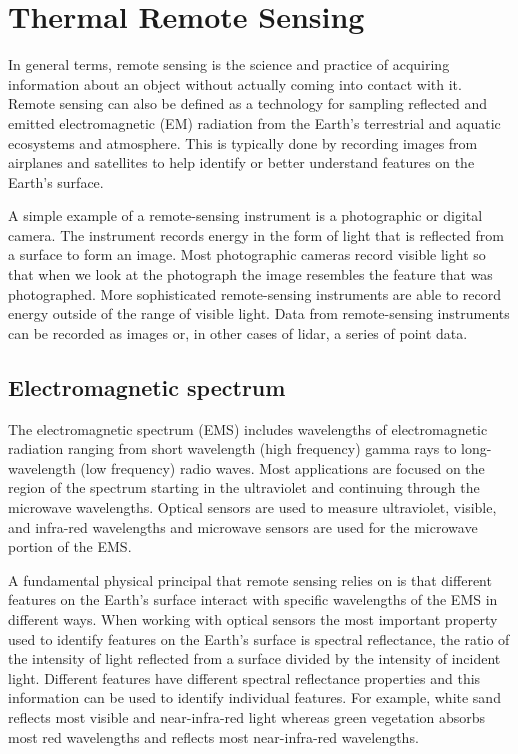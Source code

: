     
\section{Thermal Remote Sensing} \label{sec:thermal_remote_sensing}

In general terms, remote sensing is the science and practice of acquiring information about an object without actually coming into contact with it.
Remote sensing can also be defined as a technology for sampling reflected and emitted electromagnetic (EM) radiation from the Earth’s terrestrial and aquatic ecosystems and atmosphere.
This is typically done by recording images from airplanes and satellites to help identify or better understand features on the Earth’s surface.

A simple example of a remote-sensing instrument is a photographic or digital camera.
The instrument records energy in the form of light that is reflected from a surface to form an image.
Most photographic cameras record visible light so that when we look at the photograph the image resembles the feature that was photographed.
More sophisticated remote-sensing instruments are able to record energy outside of the range of visible light.
Data from remote-sensing instruments can be recorded as images or, in other cases of lidar, a series of point data.

    \subsection{Electromagnetic spectrum}

    The electromagnetic spectrum (EMS) includes wavelengths of electromagnetic radiation ranging from short wavelength (high frequency) gamma rays to long-wavelength (low frequency) radio waves. 
    Most applications are focused on the region of the spectrum starting in the ultraviolet and continuing through the microwave wavelengths. 
    Optical sensors are used to measure ultraviolet, visible, and infra-red wavelengths and microwave sensors are used for the microwave portion of the EMS.
    
    A fundamental physical principal that remote sensing relies on is that different features on the Earth's surface interact with specific wavelengths of the EMS in different ways.
    When working with optical sensors the most important property used to identify features on the Earth's surface is spectral reflectance, the ratio of the intensity of light reflected from a surface divided by the intensity of incident light.
    Different features have different spectral reflectance properties and this information can be used to identify individual features.
    For example, white sand reflects most visible and near-infra-red light whereas green vegetation absorbs most red wavelengths and reflects most near-infra-red wavelengths.    

